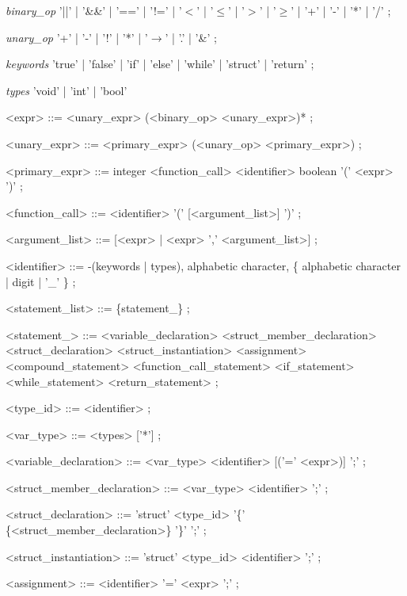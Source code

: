 \documentclass{article}
\begin{document}
\begin{EBNF}
\item[\textit{binary\_op}]
    '||'
    | '\&\&'
    | '=='
    | '!='
    | '$<$'
    | '$\leq$'
    | '$>$'
    | '$\geq$'
    | '+'
    | '-'
    | '*'
    | '/'
    ;
\item[\textit{unary\_op}]
    '+'
    | '-'
    | '!'
    | '*'
    | '$\rightarrow$'
    | '.'
    | '\&'
    ;
\item[\textit{keywords}]
    'true' | 'false' | 'if' | 'else' | 'while' | 'struct' | 'return'
    ;
\item[\textit{types}]
    'void' | 'int' | 'bool'
\end{EBNF}
\begin{grammar}
<expr> ::=
    <unary\_expr> (<binary\_op> <unary\_expr>)*
    ;

<unary\_expr> ::=
	<primary\_expr>
    \alt (<unary\_op> <primary\_expr>)
    ;

<primary\_expr> ::=
	integer
    \alt   <function\_call>
    \alt   <identifier>
    \alt   boolean
    \alt   '(' <expr> ')'
;

<function\_call> ::=
<identifier> '(' [<argument\_list>] ')'
;

<argument\_list> ::= [<expr> | <expr> ',' <argument\_list>] ;

<identifier> ::=
	-(keywords | types),
	alphabetic character, \{ alphabetic character | digit | '\_' \} ;

<statement_list> ::=
    \{statement_\}
    ;

<statement_> ::=
	<variable_declaration>
    \alt   <struct_member_declaration>
    \alt   <struct_declaration>
    \alt   <struct_instantiation>
    \alt   <assignment>
    \alt   <compound_statement>
    \alt   <function_call_statement>
    \alt   <if_statement>
    \alt   <while_statement>
    \alt   <return_statement>
    ;

<type_id> ::= <identifier> ;

<var_type> ::= <types> ['*'] ;

<variable_declaration> ::=
	<var_type> <identifier> [('=' <expr>)] ';' ;

<struct_member_declaration> ::=
	<var_type> <identifier> ';' ;

<struct_declaration> ::=
	'struct' <type_id>
    '\{'
    \{<struct_member_declaration>\}
    '\}'
    ';'
    ;

<struct_instantiation> ::=
	'struct'
    <type_id>
    <identifier>
    ';'
    ;

<assignment> ::=
	<identifier>
       '='
       <expr>
       ';'
    ;


\end{grammar}
\end{document}
